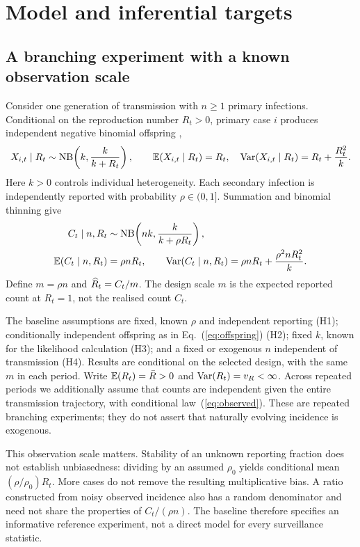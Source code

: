 \section{Model and inferential targets}
\label{sec:background}

\subsection{A branching experiment with a known observation scale}
\label{sec:bg-model}

Consider one generation of transmission with $n\ge1$ primary infections. Conditional on the reproduction number $R_t>0$, primary case $i$ produces independent negative binomial offspring \citep{lloydsmith2005superspreading},
\begin{equation}
  X_{i,t}\mid R_t\sim\mathrm{NB}\!\left(k,\frac{k}{k+R_t}\right),\qquad
  \mathbb{E}(X_{i,t}\mid R_t)=R_t,\quad
  \mathrm{Var}(X_{i,t}\mid R_t)=R_t+\frac{R_t^2}{k}.
  \label{eq:offspring}
\end{equation}
Here $k>0$ controls individual heterogeneity. Each secondary infection is independently reported with probability $\rho\in(0,1]$. Summation and binomial thinning give
\begin{equation}
\begin{aligned}
  C_t\mid n,R_t&\sim\mathrm{NB}\!\left(nk,\frac{k}{k+\rho R_t}\right),\\
  \mathbb{E}(C_t\mid n,R_t)&=\rho nR_t,\qquad
  \mathrm{Var}(C_t\mid n,R_t)=\rho nR_t+\frac{\rho^2nR_t^2}{k}.
\end{aligned}
  \label{eq:observed}
\end{equation}
Define $m=\rho n$ and $\widehat R_t=C_t/m$. The design scale $m$ is the expected reported count at $R_t=1$, not the realised count $C_t$.

The baseline assumptions are fixed, known $\rho$ and independent reporting (H1); conditionally independent offspring as in Eq.~(\ref{eq:offspring}) (H2); fixed $k$, known for the likelihood calculation (H3); and a fixed or exogenous $n$ independent of transmission (H4). Results are conditional on the selected design, with the same $m$ in each period. Write $\mathbb{E}(R_t)=\bar R>0$ and $\mathrm{Var}(R_t)=v_R<\infty$. Across repeated periods we additionally assume that counts are independent given the entire transmission trajectory, with conditional law~(\ref{eq:observed}). These are repeated branching experiments; they do not assert that naturally evolving incidence is exogenous.

This observation scale matters. Stability of an unknown reporting fraction does not establish unbiasedness: dividing by an assumed $\rho_0$ yields conditional mean $(\rho/\rho_0)R_t$. More cases do not remove the resulting multiplicative bias. A ratio constructed from noisy observed incidence also has a random denominator and need not share the properties of $C_t/(\rho n)$. The baseline therefore specifies an informative reference experiment, not a direct model for every surveillance statistic.

